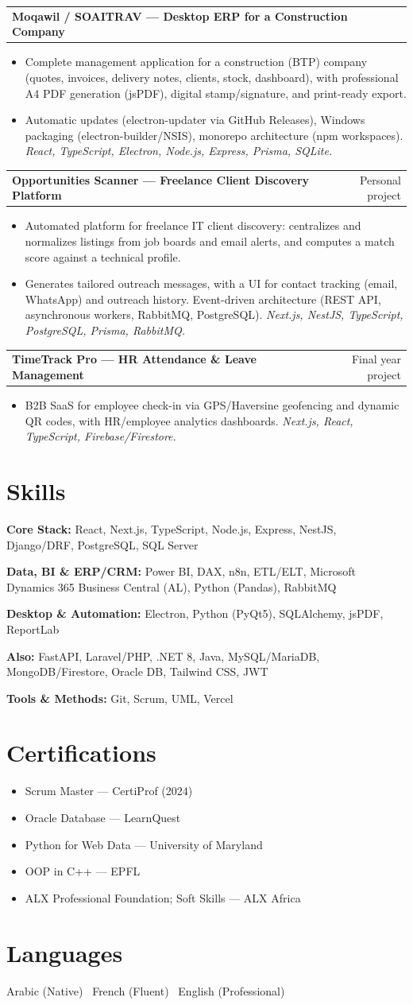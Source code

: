 \documentclass[11pt,a4paper]{article}
\makeatletter
\newcommand{\entry}[2]{%
  \noindent
  \begin{tabularx}{\textwidth}{@{}X r@{}}
    \textbf{#1} & {\small #2} \\
  \end{tabularx}\par\vspace{1pt}
}
\newcommand{\items}[1]{%
  \begin{itemize}[leftmargin=14pt, itemsep=1.5pt, topsep=2pt, parsep=0pt]
    #1
  \end{itemize}
}
\newcommand{\skillLine}[2]{\textbf{#1:} #2\par\vspace{3pt}}
\makeatother
\begin{document}
\entry{Moqawil / SOAITRAV --- Desktop ERP for a Construction Company}{}
\items{
  \item Complete management application for a construction (BTP) company (quotes, invoices, delivery notes, clients, stock, dashboard), with professional A4 PDF generation (jsPDF), digital stamp/signature, and print-ready export.
  \item Automatic updates (electron-updater via GitHub Releases), Windows packaging (electron-builder/NSIS), monorepo architecture (npm workspaces). \textit{React, TypeScript, Electron, Node.js, Express, Prisma, SQLite.}
}

\entry{Opportunities Scanner --- Freelance Client Discovery Platform}{Personal project}
\items{
  \item Automated platform for freelance IT client discovery: centralizes and normalizes listings from job boards and email alerts, and computes a match score against a technical profile.
  \item Generates tailored outreach messages, with a UI for contact tracking (email, WhatsApp) and outreach history. Event-driven architecture (REST API, asynchronous workers, RabbitMQ, PostgreSQL). \textit{Next.js, NestJS, TypeScript, PostgreSQL, Prisma, RabbitMQ.}
}

\entry{TimeTrack Pro --- HR Attendance \& Leave Management}{Final year project}
\items{
  \item B2B SaaS for employee check-in via GPS/Haversine geofencing and dynamic QR codes, with HR/employee analytics dashboards. \textit{Next.js, React, TypeScript, Firebase/Firestore.}
}

\section{Skills}

\skillLine{Core Stack}{React, Next.js, TypeScript, Node.js, Express, NestJS, Django/DRF, PostgreSQL, SQL Server}
\skillLine{Data, BI \& ERP/CRM}{Power BI, DAX, n8n, ETL/ELT, Microsoft Dynamics 365 Business Central (AL), Python (Pandas), RabbitMQ}
\skillLine{Desktop \& Automation}{Electron, Python (PyQt5), SQLAlchemy, jsPDF, ReportLab}
\skillLine{Also}{FastAPI, Laravel/PHP, .NET 8, Java, MySQL/MariaDB, MongoDB/Firestore, Oracle DB, Tailwind CSS, JWT}
\skillLine{Tools \& Methods}{Git, Scrum, UML, Vercel}

\section{Certifications}
\items{
  \item Scrum Master --- CertiProf (2024)
  \item Oracle Database --- LearnQuest
  \item Python for Web Data --- University of Maryland
  \item OOP in C++ --- EPFL
  \item ALX Professional Foundation; Soft Skills --- ALX Africa
}

\section{Languages}
Arabic (Native) \textbar\ French (Fluent) \textbar\ English (Professional)
\end{document}
